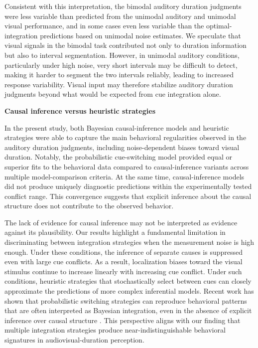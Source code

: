 \documentclass[9pt,lineno,doublespacing]{elife}
\begin{document}
Consistent with this interpretation, the bimodal auditory duration judgments were less variable than predicted from the unimodal auditory and unimodal visual performance, and in some cases even less variable than the optimal-integration predictions based on unimodal noise estimates. We speculate that visual signals in the bimodal task contributed not only to duration information but also to interval segmentation. However, in unimodal auditory conditions, particularly under high noise, very short intervals may be difficult to detect, making it harder to segment the two intervals reliably, leading to increased response variability. Visual input may therefore stabilize auditory duration judgments beyond what would be expected from cue integration alone.



\textbf{Causal inference versus heuristic strategies}

In the present study, both Bayesian causal-inference models and heuristic strategies were able to capture the main behavioral regularities observed in the auditory duration judgments, including noise-dependent biases toward visual duration. Notably, the probabilistic cue-switching model provided equal or superior fits to the behavioral data compared to causal-inference variants across multiple model-comparison criteria. At the same time, causal-inference models did not produce uniquely diagnostic predictions within the experimentally tested conflict range. This convergence suggests that explicit inference about the causal structure does not contribute to the observed behavior. 

The lack of evidence for causal inference may not be interpreted as evidence against its plausibility. Our results highlight a fundamental limitation in discriminating between integration strategies when the measurement noise is high enough. Under these conditions, the inference of separate causes is suppressed even with large cue conflicts. As a result, localization biases toward the visual stimulus continue to increase linearly with increasing cue conflict. Under such conditions, heuristic strategies that stochastically select between cues can closely approximate the predictions of more complex inferential models. Recent work has shown that probabilistic switching strategies can reproduce behavioral patterns that are often interpreted as Bayesian integration, even in the absence of explicit inference over causal structure \citep{ni2024computational}. This perspective aligns with our finding that multiple integration strategies produce near-indistinguishable behavioral signatures in audiovisual-duration perception.
\end{document}
